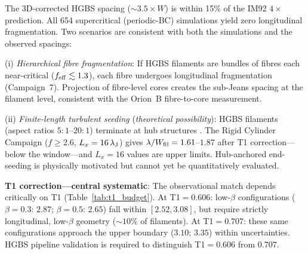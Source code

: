 \documentclass[twoside,twocolumn]{mnras}
\begin{document}
The 3D-corrected HGBS spacing (${\sim}3.5\times W$) is within 15\% of the IM92
$4\times$ prediction. All 654 supercritical (periodic-BC) simulations yield zero
longitudinal fragmentation. Two scenarios are consistent with both the simulations
and the observed spacings:

(i) \textit{Hierarchical fibre fragmentation}: If HGBS filaments are bundles of fibres each near-critical ($f_{\rm eff} \lesssim 1.3$), each fibre undergoes longitudinal fragmentation (Campaign~7). Projection of fibre-level cores creates the sub-Jeans spacing at the filament level, consistent with the \citet{Yang2024} Orion~B fibre-to-core measurement.

(ii) \textit{Finite-length turbulent seeding} (\textit{theoretical possibility}):
HGBS filaments (aspect ratios $5:1$--$20:1$) terminate at hub structures \citep{Andre2010}.
The Rigid Cylinder Campaign ($f \geq 2.6$, $L_x=16\,\lambda_{\rm J}$) gives
$\lambda/W_{\rm fil} = 1.61$--$1.87$ after T1 correction---below the window---and
$L_x=16$ values are upper limits. Hub-anchored end-seeding is physically motivated
but cannot yet be quantitatively evaluated.

\textbf{T1 correction---central systematic}: The observational match depends critically
on T1 (Table~\ref{tab:t1_budget}). At T1$=0.606$: low-$\beta$ configurations
($\beta=0.3$: $2.87$; $\beta=0.5$: $2.65$) fall within $[2.52, 3.08]$, but require
strictly longitudinal, low-$\beta$ geometry (${\sim}10\%$ of filaments). At T1$=0.707$:
these same configurations approach the upper boundary ($3.10$; $3.35$) within
uncertainties. HGBS pipeline validation is required to distinguish T1$=0.606$ from $0.707$.
\end{document}
